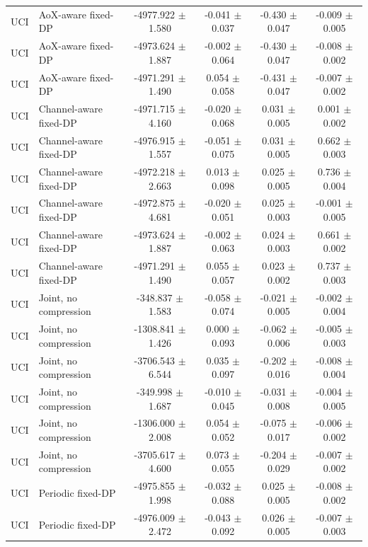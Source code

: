 \begin{tabular}{llcccc}
UCI & AoX-aware fixed-DP & -4977.922 $\pm$ 1.580 & -0.041 $\pm$ 0.037 & -0.430 $\pm$ 0.047 & -0.009 $\pm$ 0.005 \\
UCI & AoX-aware fixed-DP & -4973.624 $\pm$ 1.887 & -0.002 $\pm$ 0.064 & -0.430 $\pm$ 0.047 & -0.008 $\pm$ 0.002 \\
UCI & AoX-aware fixed-DP & -4971.291 $\pm$ 1.490 & 0.054 $\pm$ 0.058 & -0.431 $\pm$ 0.047 & -0.007 $\pm$ 0.002 \\
UCI & Channel-aware fixed-DP & -4971.715 $\pm$ 4.160 & -0.020 $\pm$ 0.068 & 0.031 $\pm$ 0.005 & 0.001 $\pm$ 0.002 \\
UCI & Channel-aware fixed-DP & -4976.915 $\pm$ 1.557 & -0.051 $\pm$ 0.075 & 0.031 $\pm$ 0.005 & 0.662 $\pm$ 0.003 \\
UCI & Channel-aware fixed-DP & -4972.218 $\pm$ 2.663 & 0.013 $\pm$ 0.098 & 0.025 $\pm$ 0.005 & 0.736 $\pm$ 0.004 \\
UCI & Channel-aware fixed-DP & -4972.875 $\pm$ 4.681 & -0.020 $\pm$ 0.051 & 0.025 $\pm$ 0.003 & -0.001 $\pm$ 0.005 \\
UCI & Channel-aware fixed-DP & -4973.624 $\pm$ 1.887 & -0.002 $\pm$ 0.063 & 0.024 $\pm$ 0.003 & 0.661 $\pm$ 0.002 \\
UCI & Channel-aware fixed-DP & -4971.291 $\pm$ 1.490 & 0.055 $\pm$ 0.057 & 0.023 $\pm$ 0.002 & 0.737 $\pm$ 0.003 \\
UCI & Joint, no compression & -348.837 $\pm$ 1.583 & -0.058 $\pm$ 0.074 & -0.021 $\pm$ 0.005 & -0.002 $\pm$ 0.004 \\
UCI & Joint, no compression & -1308.841 $\pm$ 1.426 & 0.000 $\pm$ 0.093 & -0.062 $\pm$ 0.006 & -0.005 $\pm$ 0.003 \\
UCI & Joint, no compression & -3706.543 $\pm$ 6.544 & 0.035 $\pm$ 0.097 & -0.202 $\pm$ 0.016 & -0.008 $\pm$ 0.004 \\
UCI & Joint, no compression & -349.998 $\pm$ 1.687 & -0.010 $\pm$ 0.045 & -0.031 $\pm$ 0.008 & -0.004 $\pm$ 0.005 \\
UCI & Joint, no compression & -1306.000 $\pm$ 2.008 & 0.054 $\pm$ 0.052 & -0.075 $\pm$ 0.017 & -0.006 $\pm$ 0.002 \\
UCI & Joint, no compression & -3705.617 $\pm$ 4.600 & 0.073 $\pm$ 0.055 & -0.204 $\pm$ 0.029 & -0.007 $\pm$ 0.002 \\
UCI & Periodic fixed-DP & -4975.855 $\pm$ 1.998 & -0.032 $\pm$ 0.088 & 0.025 $\pm$ 0.005 & -0.008 $\pm$ 0.002 \\
UCI & Periodic fixed-DP & -4976.009 $\pm$ 2.472 & -0.043 $\pm$ 0.092 & 0.026 $\pm$ 0.005 & -0.007 $\pm$ 0.003 \\

\end{tabular}
